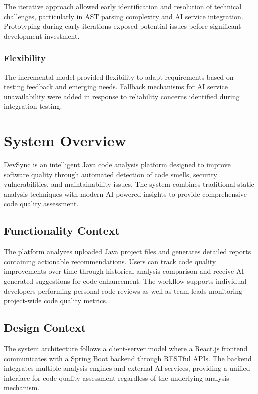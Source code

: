 \documentclass[12pt,a4paper]{article}
\begin{document}
    The iterative approach allowed early identification and resolution of technical challenges, particularly in AST parsing complexity and AI service integration. Prototyping during early iterations exposed potential issues before significant development investment.

    \subsubsection{Flexibility}

    The incremental model provided flexibility to adapt requirements based on testing feedback and emerging needs. Fallback mechanisms for AI service unavailability were added in response to reliability concerns identified during integration testing.

    \section{System Overview}

    DevSync is an intelligent Java code analysis platform designed to improve software quality through automated detection of code smells, security vulnerabilities, and maintainability issues. The system combines traditional static analysis techniques with modern AI-powered insights to provide comprehensive code quality assessment.

    \subsection{Functionality Context}

    The platform analyzes uploaded Java project files and generates detailed reports containing actionable recommendations. Users can track code quality improvements over time through historical analysis comparison and receive AI-generated suggestions for code enhancement. The workflow supports individual developers performing personal code reviews as well as team leads monitoring project-wide code quality metrics.

    \subsection{Design Context}

    The system architecture follows a client-server model where a React.js frontend communicates with a Spring Boot backend through RESTful APIs. The backend integrates multiple analysis engines and external AI services, providing a unified interface for code quality assessment regardless of the underlying analysis mechanism.
\end{document}
